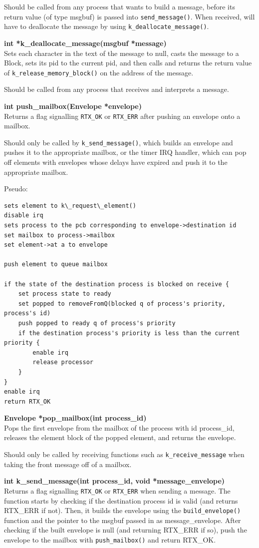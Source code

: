 \documentclass[11pt, oneside]{article}
\begin{document}
Should be called from any process that wants to build a message, before its return value (of type msgbuf) is passed into {\tt send\_message()}. When received, will have to deallocate the message by using {\tt k\_deallocate\_message()}.

{\bf int *k\_deallocate\_message(msgbuf *message)}\\
Sets each character in the text of the message to null, casts the message to a Block, sets its pid to the current pid, and then calls and returns the return value of {\tt k\_release\_memory\_block()} on the address of the message.

Should be called from any process that receives and interprets a message.

{\bf int push\_mailbox(Envelope *envelope)}\\
Returns a flag signalling {\tt RTX\_OK} or {\tt RTX\_ERR} after pushing an envelope onto a mailbox.

Should only be called by {\tt k\_send\_message()}, which builds an envelope and pushes it to the appropriate mailbox, or the timer IRQ handler, which can pop off elements with envelopes whose delays have expired and push it to the appropriate mailbox.

Pseudo:
\begin{verbatim}
sets element to k\_request\_element()
disable irq
sets process to the pcb corresponding to envelope->destination id
set mailbox to process->mailbox
set element->at a to envelope

push element to queue mailbox

if the state of the destination process is blocked on receive {
    set process state to ready
    set popped to removeFromQ(blocked q of process's priority, process's id)
    push popped to ready q of process's priority
    if the destination process's priority is less than the current priority {
        enable irq
        release processor
    }
}
enable irq
return RTX_OK
\end{verbatim}

{\bf Envelope *pop\_mailbox(int process\_id)}\\
Pops the first envelope from the mailbox of the process with id process\_id, releases the element block of the popped element, and returns the envelope.

Should only be called by receiving functions such as {\tt k\_receive\_message} when taking the front message off of a mailbox.

{\bf int k\_send\_message(int process\_id, void *message\_envelope)}\\
Returns a flag signalling {\tt RTX\_OK} or {\tt RTX\_ERR} when sending a message. The function starts by checking if the destination process id is valid (and returns RTX\_ERR if not). Then, it builds the envelope using the {\tt build\_envelope()} function and the pointer to the msgbuf passed in as message\_envelope. After checking if the built envelope is null (and returning RTX\_ERR if so), push the envelope to the mailbox with {\tt push\_mailbox()} and return RTX\_OK.
\end{document}
